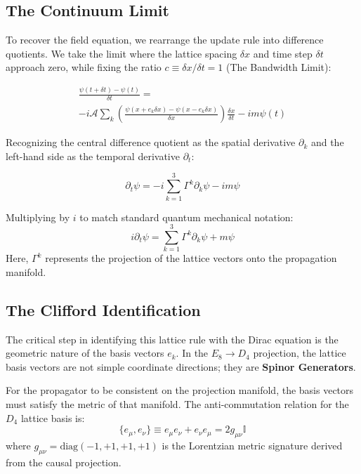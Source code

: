 \subsection{The Continuum Limit}
To recover the field equation, we rearrange the update rule into difference quotients. We take the limit where the lattice spacing $\delta x$ and time step $\delta t$ approach zero, while fixing the ratio $c \equiv \delta x / \delta t = 1$ (The Bandwidth Limit):

\begin{equation}
\begin{split}
    \frac{\psi(t+\delta t) - \psi(t)}{\delta t} = \\ 
    -i \mathcal{A} \sum_{k} \left( \frac{\psi(x + e_k \delta x) - \psi(x - e_k \delta x)}{\delta x} \right) \frac{\delta x}{\delta t} 
    - i m \psi(t)
    \end{split}
\end{equation}

Recognizing the central difference quotient as the spatial derivative $\partial_k$ and the left-hand side as the temporal derivative $\partial_t$:

\begin{equation}
    \partial_t \psi = -i \sum_{k=1}^{3} \Gamma^k \partial_k \psi - i m \psi
\end{equation}

Multiplying by $i$ to match standard quantum mechanical notation:
\begin{equation}
    i \partial_t \psi = \sum_{k=1}^{3} \Gamma^k \partial_k \psi + m \psi
\end{equation}
Here, $\Gamma^k$ represents the projection of the lattice vectors onto the propagation manifold.

\subsection{The Clifford Identification}
The critical step in identifying this lattice rule with the Dirac equation is the geometric nature of the basis vectors $e_k$. In the $E_8 \to D_4$ projection, the lattice basis vectors are not simple coordinate directions; they are \textbf{Spinor Generators}.

For the propagator to be consistent on the projection manifold, the basis vectors must satisfy the metric of that manifold. The anti-commutation relation for the $D_4$ lattice basis is:
\begin{equation}
    \{e_\mu, e_\nu\} \equiv e_\mu e_\nu + e_\nu e_\mu = 2g_{\mu\nu} \mathbb{I}
\end{equation}
where $g_{\mu\nu} = \text{diag}(-1,+1,+1,+1)$ is the Lorentzian metric signature derived from the causal projection.

